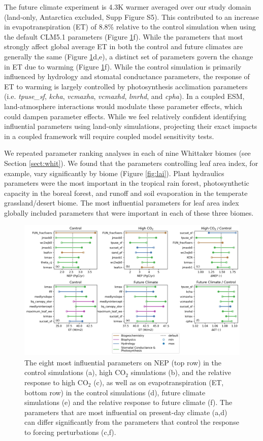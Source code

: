 \documentclass[draft]{agujournal2019}
\begin{document}
The future climate experiment is 4.3K warmer averaged over our study domain (land-only, Antarctica excluded, Supp Figure S5). This contributed to an increase in evapotranspiration (ET) of 8.8\% relative to the control simulation when using the default CLM5.1 parameters (Figure \ref{fig:nep}f). While the parameters that most strongly affect global average ET in both the control and future climates are generally the same (Figure \ref{fig:nep}d,e), a distinct set of parameters govern the change in ET due to warming (Figure \ref{fig:nep}f). While the control simulation is primarily influenced by hydrology and stomatal conductance parameters, the response of ET to warming is largely controlled by photosynthesis acclimation parameters (i.e. \textit{tpuse\_sf}, \textit{kcha}, \textit{vcmaxha}, \textit{vcmaxhd}, \textit{lmrhd}, and \textit{cpha}). In a coupled ESM, land-atmosphere interactions would modulate these parameter effects, which could dampen parameter effects. While we feel relatively confident identifying influential parameters using land-only simulations, projecting their exact impacts in a coupled framework will require coupled model sensitivity tests.

We repeated parameter ranking analyses in each of nine Whittaker biomes (see Section \ref{sect:whit}). We found that the parameters controlling leaf area index, for example, vary significantly by biome (Figure \ref{fig:lai}). Plant hydraulics parameters were the most important in the tropical rain forest, photosynthetic capacity in the boreal forest, and runoff and soil evaporation in the temperate grassland/desert biome. The most influential parameters for leaf area index globally included parameters that were important in each of these three biomes. 

\begin{figure}[h]
\centering
\includegraphics[width=\textwidth]{../figs/main/deltas.png}
\caption{The eight most influential parameters on NEP (top row) in the control simulations (a), high CO$_2$ simulations (b), and the relative response to high CO$_2$ (c), as well as on evapotranspiration (ET, bottom row) in the control simulations (d), future climate simulations (e) and the relative response to future climate (f). The parameters that are most influential on present-day climate (a,d) can differ significantly from the parameters that control the response to forcing perturbations (c,f).}
\label{fig:nep}
\end{figure}
\end{document}

